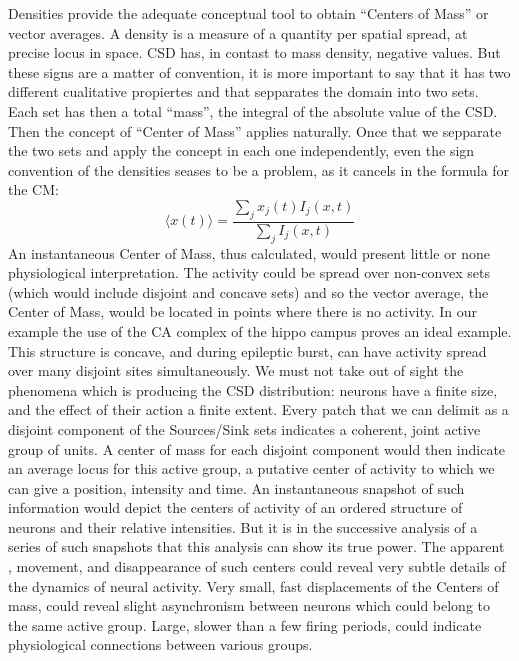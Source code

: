 \documentclass{article}
\begin{document}
Densities provide the adequate conceptual tool to obtain ``Centers of Mass'' or vector averages. A density is a measure of a quantity per spatial spread, at precise locus in space. CSD has, in contast to mass density, negative values. But these signs are a matter of convention, it is more important to say that it has two different cualitative propiertes and that sepparates the domain into two sets. Each set has then a total ``mass'', the integral of the absolute value of the CSD. Then the concept of ``Center of Mass'' applies naturally. Once that we sepparate the two sets and apply the concept in each one independently, even the sign convention of the densities seases to be a problem, as it cancels in the formula for the CM:
\begin{equation}
\langle x(t) \rangle =\frac{\sum_j x_{j} (t) I_{j} (x,t)} {\sum_j I_{j}(x,t)}
\end{equation}
An instantaneous Center of Mass, thus calculated, would present little or none physiological interpretation. The activity could be spread over non-convex sets (which would include disjoint and concave sets) and so the vector average, the Center of Mass, would be located in points where there is no activity. In our example the use of the CA complex of the hippo campus proves an ideal example. This structure is concave, and during epileptic burst, can have activity spread over many disjoint sites simultaneously. We must not take out of sight the phenomena which is producing the CSD distribution: neurons have a finite size, and the effect of their action a finite extent. Every patch that we can delimit as a disjoint component of the Sources/Sink sets indicates a coherent, joint active group of units. A center of mass for each disjoint component would then indicate an average locus for this active group, a putative center of activity to which we can give a position, intensity and time. An instantaneous snapshot of such information would depict the centers of activity of an ordered structure of neurons and their relative intensities. But it is in the successive analysis of a series of such snapshots that this analysis can show its true power. The apparent , movement, and disappearance of such centers could reveal very subtle details of the dynamics of neural activity. Very small, fast displacements of the Centers of mass, could reveal slight asynchronism between neurons which could belong to the same active group. Large, slower than a few firing periods, could indicate physiological connections between various groups.
\end{document}
